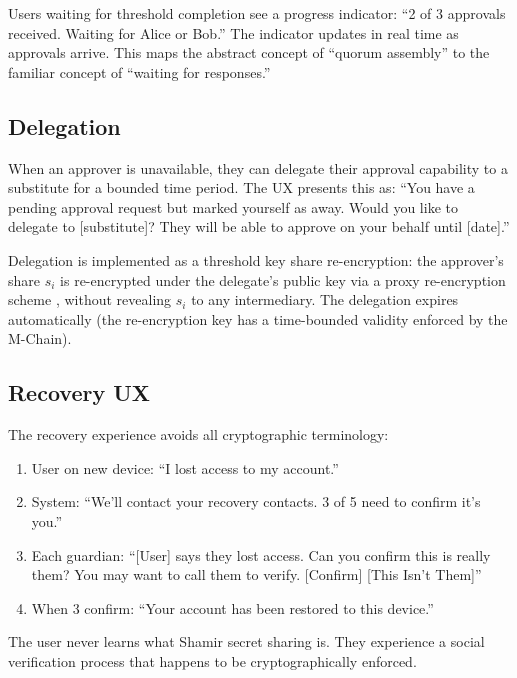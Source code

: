 Users waiting for threshold completion see a progress indicator:
``2 of 3 approvals received. Waiting for Alice or Bob.'' The indicator
updates in real time as approvals arrive. This maps the abstract concept
of ``quorum assembly'' to the familiar concept of ``waiting for responses.''

\subsection{Delegation}

When an approver is unavailable, they can delegate their approval
capability to a substitute for a bounded time period. The UX presents
this as: ``You have a pending approval request but marked yourself as
away. Would you like to delegate to [substitute]? They will be able to
approve on your behalf until [date].''

Delegation is implemented as a threshold key share re-encryption: the
approver's share $s_i$ is re-encrypted under the delegate's public key
via a proxy re-encryption scheme \cite{blaze1998divertible}, without
revealing $s_i$ to any intermediary. The delegation expires automatically
(the re-encryption key has a time-bounded validity enforced by the
M-Chain).

\subsection{Recovery UX}

The recovery experience avoids all cryptographic terminology:

\begin{enumerate}
    \item User on new device: ``I lost access to my account.''
    \item System: ``We'll contact your recovery contacts. 3 of 5 need to
    confirm it's you.''
    \item Each guardian: ``[User] says they lost access. Can you confirm
    this is really them? You may want to call them to verify.
    [Confirm] [This Isn't Them]''
    \item When 3 confirm: ``Your account has been restored to this device.''
\end{enumerate}

The user never learns what Shamir secret sharing is. They experience
a social verification process that happens to be cryptographically
enforced.

